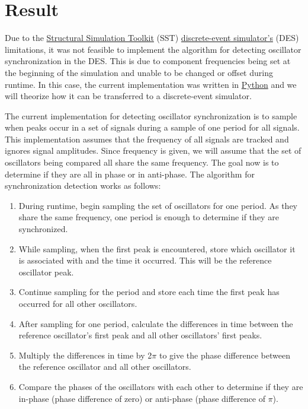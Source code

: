 \documentclass{article}
\begin{document}
\section{Result} %

Due to the \href{http://sst-simulator.org/}{Structural Simulation Toolkit} (SST) \href{https://en.wikipedia.org/wiki/Discrete-event_simulation}{discrete-event simulator's} (DES) limitations, it was not feasible to implement the algorithm for detecting oscillator synchronization in the DES. This is due to component frequencies being set at the beginning of the simulation and unable to be changed or offset during runtime. In this case, the current implementation was written in \href{https://www.python.org/about/}{Python} and we will theorize how it can be transferred to a discrete-event simulator. 

The current implementation for detecting oscillator synchronization is to sample when peaks occur in a set of signals during a sample of one period for all signals. This implementation assumes that the frequency of all signals are tracked and ignores signal amplitudes. Since frequency is given, we will assume that the set of oscillators being compared all share the same frequency. The goal now is to determine if they are all in phase or in anti-phase. The algorithm for synchronization detection works as follows:

\begin{enumerate}
	\item During runtime, begin sampling the set of oscillators for one period. As they share the same frequency, one period is enough to determine if they are synchronized.
	\item While sampling, when the first peak is encountered, store which oscillator it is associated with and the time it occurred. This will be the reference oscillator peak.
	\item Continue sampling for the period and store each time the first peak has occurred for all other oscillators.
	\item After sampling for one period, calculate the differences in time between the reference oscillator's first peak and all other oscillators' first peaks.
	\item Multiply the differences in time by 2$\pi$ to give the phase difference between the reference oscillator and all other oscillators.
	\item Compare the phases of the oscillators with each other to determine if they are in-phase (phase difference of zero) or anti-phase (phase difference of $\pi$).
\end{enumerate}
\end{document}
